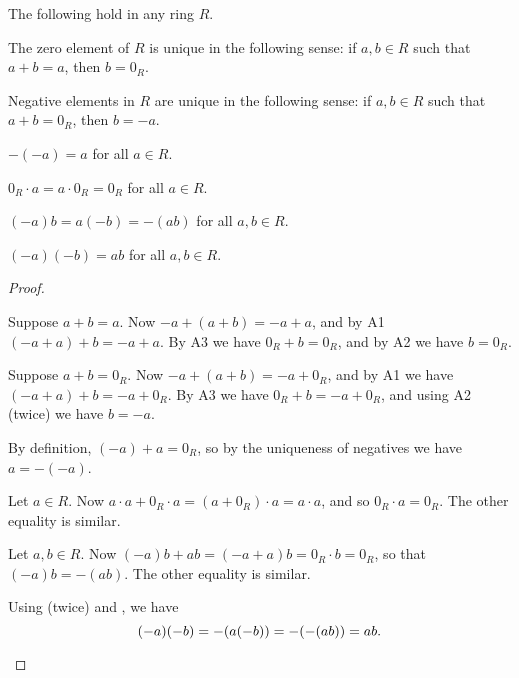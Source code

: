 \begin{prop} \label{prop:ring-basics}
The following hold in any ring \(R\).
\begin{proplist}
\item The zero element of \(R\) is unique in the following sense: if \(a,b \in R\) such that \(a+b = a\), then \(b = 0_R\). \label{prop:ring-basics:zero-unique}
\item Negative elements in \(R\) are unique in the following sense: if \(a,b \in R\) such that \(a+b = 0_R\), then \(b = -a\). \label{prop:ring-basics:negative-unique}
\item \(-(-a) = a\) for all \(a \in R\). \label{prop:ring-basics:neg-neg}
\item \(0_R \cdot a = a \cdot 0_R = 0_R\) for all \(a \in R\). \label{prop:ring-basics:zero-times}
\item \((-a)b = a(-b) = -(ab)\) for all \(a,b \in R\). \label{prop:ring-basics:move-neg}
\item \((-a)(-b) = ab\) for all \(a,b \in R\). \label{prop:ring-basics:neg-times-neg}
\end{proplist}
\end{prop}

\begin{proof}
\begin{inlineproplist}
\item Suppose \(a+b = a\). Now \(-a + (a+b) = -a + a\), and by A1 \((-a + a) + b = -a + a\). By A3 we have \(0_R + b = 0_R\), and by A2 we have \(b = 0_R\).
\item Suppose \(a + b = 0_R\). Now \(-a + (a+b) = -a + 0_R\), and by A1 we have \((-a+a)+b = -a+0_R\). By A3 we have \(0_R + b = -a + 0_R\), and using A2 (twice) we have \(b = -a\).
\item By definition, \((-a) + a = 0_R\), so by the uniqueness of negatives we have \(a = -(-a)\).
\item Let \(a \in R\). Now \(a \cdot a + 0_R \cdot a = (a + 0_R) \cdot a = a \cdot a\), and so \(0_R \cdot a = 0_R\). The other equality is similar.
\item Let \(a,b \in R\). Now \((-a)b + ab = (-a + a)b = 0_R \cdot b = 0_R\), so that \((-a)b = -(ab)\). The other equality is similar.
\item Using  (twice) and , we have \[ (-a)(-b) = -(a(-b)) = -(-(ab)) = ab. \qedhere \]
\end{inlineproplist}
\end{proof}

